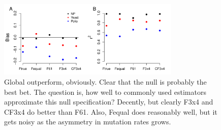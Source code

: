 \documentclass{pnastwo}
\begin{document}
\begin{figure}[H]
\centerline{\includegraphics[width=8.7cm]{figures/MainText/nyp_bias_r2.pdf}}
\caption{\label{nyp_bias_r2} Global outperform, obviously. Clear that the null is probably the best bet. The question is, how well to commonly used estimators approximate this null specification? Decently, but clearly F3x4 and CF3x4 do better than F61. Also, Fequal does reasonably well, but it gets noisy as the asymmetry in mutation rates grows.}
\end{figure}
\end{document}
